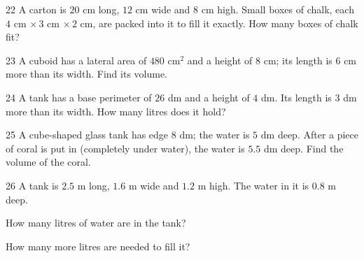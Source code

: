 \gap
\begin{probbox}{22}{\relax}
A carton is $20$ cm long, $12$ cm wide and $8$ cm high. Small boxes of chalk, each $4$ cm $\times\,3$ cm $\times\,2$ cm, are packed into it to fill it exactly. How many boxes of chalk fit?
\end{probbox}
\gap
\begin{probbox}{23}{\relax}
A cuboid has a lateral area of $480$ cm$^2$ and a height of $8$ cm; its length is $6$ cm more than its width. Find its volume.
\end{probbox}
\gap
\begin{probbox}{24}{\relax}
A tank has a base perimeter of $26$ dm and a height of $4$ dm. Its length is $3$ dm more than its width. How many litres does it hold?
\end{probbox}
\gap
\begin{probbox}{25}{\relax}
A cube-shaped glass tank has edge $8$ dm; the water is $5$ dm deep. After a piece of coral is put in (completely under water), the water is $5.5$ dm deep. Find the volume of the coral.
\end{probbox}
\gap
\begin{probbox}{26}{\relax}
A tank is $2.5$ m long, $1.6$ m wide and $1.2$ m high. The water in it is $0.8$ m deep.\par
{} How many litres of water are in the tank?\par
{} How many more litres are needed to fill it?
\end{probbox}
